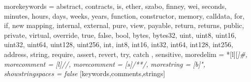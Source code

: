 


%
{morekeywords = {
  abstract, contracts, is,
  ether, szabo, finney, wei,
  seconds, minutes, hours, days, weeks, years,
  function, constructor, memory, calldata,
  for, if, new
  mapping,
  internal, external, pure, view, payable, return, returns,
  public, private, virtual, override,
  true, false, bool,
  bytes, bytes32,
  uint, uint8, uint16, uint32, uint64, uint128, uint256,
  int, int8, int16, int32, int64, int128, int256,
  address, string,
  require, assert, revert, try, catch
  },%
  sensitive,%
  moredelim = *[l][\itshape]{\#},
  morecomment = [l]//,%
  morecomment = [s]{/*}{*/},%
  morestring = [b]",%
  showstringspaces = false%
}[keywords,comments,strings]%



